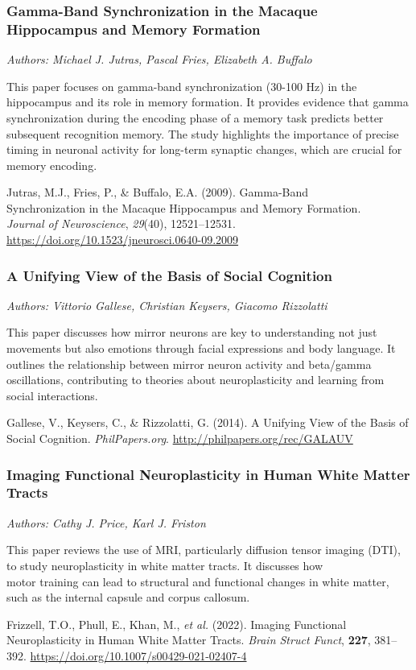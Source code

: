 \documentclass{article}
\begin{document}
\subsubsection*{Gamma-Band Synchronization in the Macaque Hippocampus and Memory Formation}
\textit{Authors: Michael J. Jutras, Pascal Fries, Elizabeth A. Buffalo}

This paper focuses on gamma-band synchronization (30-100 Hz) in the\\hippocampus and its role in memory formation. It provides evidence that gamma synchronization during the encoding phase of a memory task predicts better subsequent recognition memory. The study highlights the importance of precise timing in neuronal activity for long-term synaptic changes, which are crucial for memory encoding.

Jutras, M.J., Fries, P., \& Buffalo, E.A. (2009). Gamma-Band\\Synchronization in the Macaque Hippocampus and Memory Formation.\\ \textit{Journal of Neuroscience}, \textit{29}(40), 12521–12531.\\\href{https://doi.org/10.1523/jneurosci.0640-09.2009}{https://doi.org/10.1523/jneurosci.0640-09.2009}

\subsubsection*{A Unifying View of the Basis of Social Cognition}
\textit{Authors: Vittorio Gallese, Christian Keysers, Giacomo Rizzolatti}

This paper discusses how mirror neurons are key to understanding not just movements but also emotions through facial expressions and body language. It outlines the relationship between mirror neuron activity and beta/gamma oscillations, contributing to theories about neuroplasticity and learning from social interactions.

Gallese, V., Keysers, C., \& Rizzolatti, G. (2014). A Unifying View of the Basis of Social Cognition. \textit{PhilPapers.org}. \href{http://philpapers.org/rec/GALAUV}{http://philpapers.org/rec/GALAUV}

\subsubsection*{Imaging Functional Neuroplasticity in Human White Matter Tracts}
\textit{Authors: Cathy J. Price, Karl J. Friston}

This paper reviews the use of MRI, particularly diffusion tensor imaging (DTI), to study neuroplasticity in white matter tracts. It discusses how\\motor training can lead to structural and functional changes in white matter, such as the internal capsule and corpus callosum.

Frizzell, T.O., Phull, E., Khan, M., \textit{et al.} (2022). Imaging Functional\\Neuroplasticity in Human White Matter Tracts. \textit{Brain Struct Funct}, \textbf{227}, 381–392. \href{https://doi.org/10.1007/s00429-021-02407-4}{https://doi.org/10.1007/s00429-021-02407-4}
\end{document}
